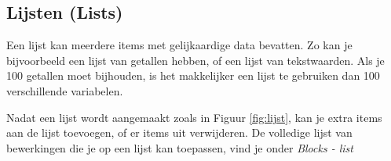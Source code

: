 \subsection{Lijsten (Lists)}
Een lijst kan meerdere items met gelijkaardige data bevatten. Zo kan je bijvoorbeeld een lijst van getallen hebben, of een lijst van tekstwaarden. Als je 100 getallen moet bijhouden, is het makkelijker een lijst te gebruiken dan 100 verschillende variabelen.

Nadat een lijst wordt aangemaakt zoals in Figuur \ref{fig:lijst}, kan je extra items aan de lijst toevoegen, of er items uit verwijderen. De volledige lijst van bewerkingen die je op een lijst kan toepassen, vind je onder \emph{Blocks - list}



